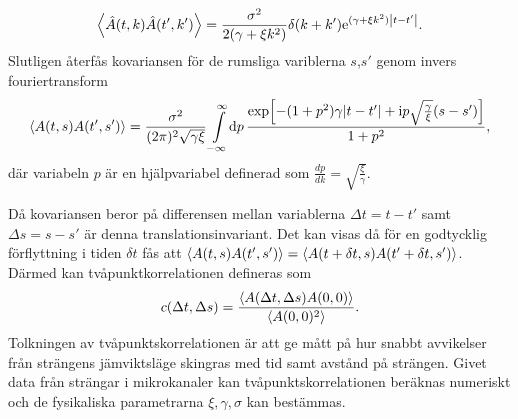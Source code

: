 \begin{equation}
    \ev{\hat{A}(t,k)\hat{A}(t',k')}=\frac{\sigma^2}{2(\gamma+\xi k^2)}\delta(k+k')\ee^{(\gamma+\xi k^2)\abs{t-t'}}.
\end{equation}
Slutligen återfås kovariansen för de rumsliga variblerna $s$,$s'$ genom invers fouriertransform
\begin{equation}
\label{2korr}
    \ev{A(t,s)A(t',s')}=\frac{\sigma^2}{(2\pi)^2\sqrt{\gamma\xi}}\int_{-\infty}^{\infty}\!\dd{p} \frac{\exp[-(1+p^2)\gamma \abs{t-t'}+\ii p\sqrt{\frac{\gamma}{\xi}}(s-s')]}{1+p^2},
\end{equation}
där variabeln $p$ är en hjälpvariabel definerad som $\frac{dp}{dk}=\sqrt{\frac{\xi}{\gamma}}$. 

Då kovariansen beror på differensen mellan variablerna $\Delta t=t-t'$ samt $\Delta s=s-s'$ är denna translationsinvariant. Det kan visas då för en godtycklig förflyttning i tiden $\delta{t}$ fås att $\ev{A(t,s)A(t',s')}=\ev{A(t+\delta t,s)A(t'+\delta t,s')}$. Därmed kan tvåpunktkorrelationen defineras som
\begin{equation}
    c(\Delta t,\Delta s)=\frac{\ev{A(\Delta t,\Delta s)A(0,0)}}{\ev{A(0,0)^2}}.
\end{equation}
Tolkningen av tvåpunktskorrelationen är att ge mått på hur snabbt avvikelser från strängens jämviktsläge skingras med tid samt avstånd på strängen. Givet data från strängar i mikrokanaler kan tvåpunktskorrelationen beräknas numeriskt och de fysikaliska parametrarna $\xi,\gamma,\sigma$ kan bestämmas. 


